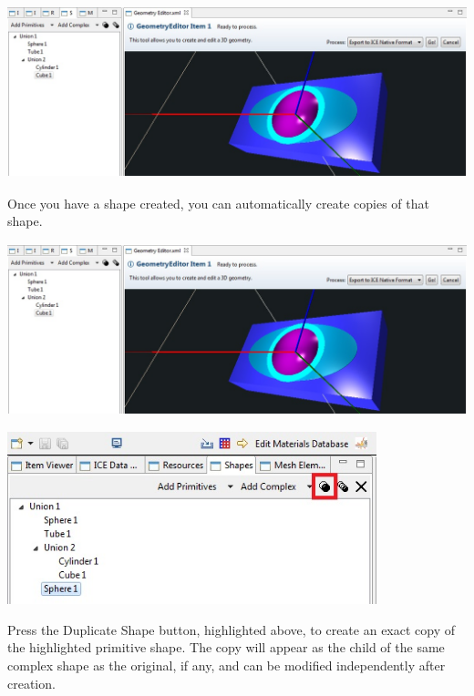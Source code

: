 \documentclass{article}
\begin{document}
\begin{center}
\includegraphics[height=5cm]{images/GeometryStackedUnions.jpg}
\end{center}


Once you have a shape created, you can automatically create copies of that
shape. 

\begin{center}
\includegraphics[height=5cm]{images/GeometryStackedUnions.jpg}
\end{center}

\begin{center}
\includegraphics[height=5cm]{images/GeometryDuplicateShape.jpg}
\end{center}

Press the Duplicate Shape button, highlighted above, to create an exact copy of
the highlighted primitive shape. The copy will appear as the child of the same
complex shape as the original, if any, and can be modified independently after
creation.
\end{document}
